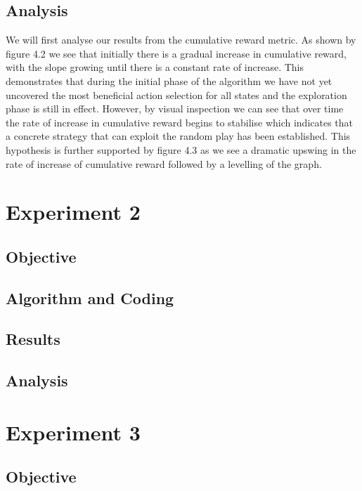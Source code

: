 \subsection{Analysis}\label{subsec:analysis1}
We will first analyse our results from the cumulative reward metric.
As shown by figure 4.2 we see that initially there is a gradual increase in cumulative reward,
with the slope growing until there is a constant rate of increase.
This demonstrates that during the initial phase of the algorithm we have not yet uncovered
the most beneficial action selection for all states and the exploration phase is still in effect.
However, by visual inspection we can see that over time the rate of increase in cumulative
reward begins to stabilise which indicates that a concrete strategy that can exploit
the random play has been established.
This hypothesis is further supported by figure 4.3 as we see a dramatic upswing
in the rate of increase of cumulative reward followed by a levelling of the graph.

\section{Experiment 2} \label{sec:experiment2}

\subsection{Objective}\label{subsec:objective2}
\subsection{Algorithm and Coding}\label{subsec:algAndCoding2}
\subsection{Results}\label{subsec:results2}
\subsection{Analysis}\label{subsec:analysis2}

\section{Experiment 3}\label{sec:experiment3}

\subsection{Objective}\label{subsec:objective3}
